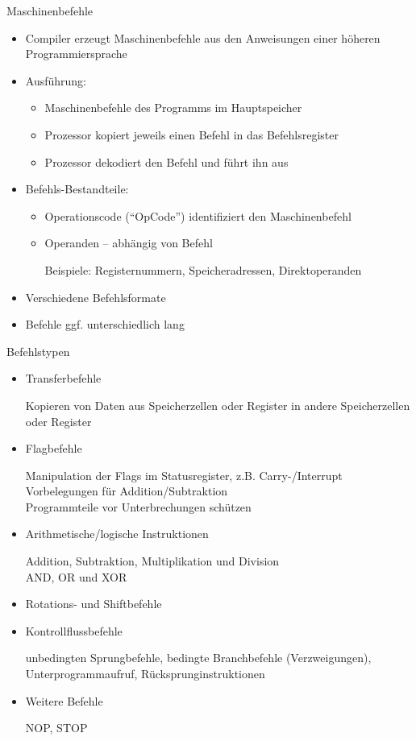\documentclass[utf8,9pt]{beamer}
\begin{document}
\begin{frame}{Maschinenbefehle}{}

\begin{block}{}
\begin{itemize}
\item Compiler erzeugt Maschinenbefehle aus den Anweisungen
   einer höheren Programmiersprache
\item Ausführung:
   \begin{itemize}
   \item Maschinenbefehle des Programms im Hauptspeicher
   \item Prozessor kopiert jeweils einen Befehl in das Befehlsregister
   \item Prozessor dekodiert den Befehl und führt ihn aus
   \end{itemize}
\item Befehls-Bestandteile:
  \begin{itemize}
  \item Operationscode ("`OpCode"') identifiziert den Maschinenbefehl
  \item Operanden -- abhängig von Befehl

    Beispiele: Registernummern, Speicheradressen, Direktoperanden
  \end{itemize}
\item Verschiedene Befehlsformate
\item Befehle ggf. unterschiedlich lang
\end{itemize}
\end{block}
\end{frame}




\begin{frame}{Befehlstypen}{}

\begin{block}{}
\begin{itemize}
\item Transferbefehle

 Kopieren von Daten aus Speicherzellen oder Register in andere Speicherzellen oder Register
\item  Flagbefehle

 Manipulation der Flags im Statusregister, z.B. Carry-/Interrupt\\
 Vorbelegungen für Addition/Subtraktion\\
 Programmteile vor Unterbrechungen schützen
\item Arithmetische/logische Instruktionen

Addition, Subtraktion, Multiplikation und Division\\
AND, OR und XOR \\
\item Rotations- und Shiftbefehle
\item  Kontrollflussbefehle

 unbedingten Sprungbefehle, bedingte Branchbefehle (Verzweigungen),
Unterprogrammaufruf, Rücksprunginstruktionen
\item  Weitere Befehle

 NOP, STOP
\end{itemize}
\end{block}
\end{frame}
\end{document}
